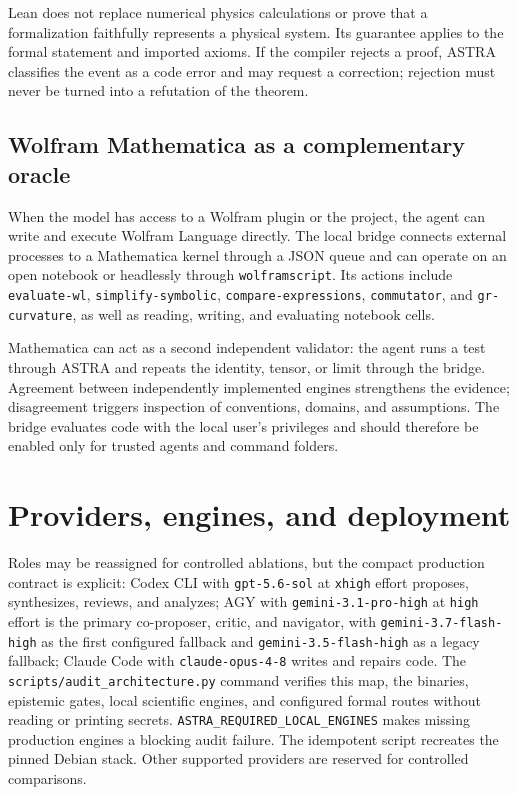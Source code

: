 \documentclass[11pt,a4paper]{article}
\begin{document}
Lean does not replace numerical physics calculations or prove that a formalization faithfully represents a physical system. Its guarantee applies to the formal statement and imported axioms. If the compiler rejects a proof, ASTRA classifies the event as a code error and may request a correction; rejection must never be turned into a refutation of the theorem.

\subsection{Wolfram Mathematica as a complementary oracle}

When the model has access to a Wolfram plugin or the  project, the agent can write and execute Wolfram Language directly. The local bridge connects external processes to a Mathematica kernel through a JSON queue and can operate on an open notebook or headlessly through \texttt{wolframscript}. Its actions include \texttt{evaluate-wl}, \texttt{simplify-symbolic}, \texttt{compare-expressions}, \texttt{commutator}, and \texttt{gr-curvature}, as well as reading, writing, and evaluating notebook cells.

Mathematica can act as a second independent validator: the agent runs a test through ASTRA and repeats the identity, tensor, or limit through the bridge. Agreement between independently implemented engines strengthens the evidence; disagreement triggers inspection of conventions, domains, and assumptions. The bridge evaluates code with the local user's privileges and should therefore be enabled only for trusted agents and command folders.

\section{Providers, engines, and deployment}

Roles may be reassigned for controlled ablations, but the compact production contract is explicit: Codex CLI with \texttt{gpt-5.6-sol} at \texttt{xhigh} effort proposes, synthesizes, reviews, and analyzes; AGY with \texttt{gemini-3.1-pro-high} at \texttt{high} effort is the primary co-proposer, critic, and navigator, with \texttt{gemini-3.7-flash-high} as the first configured fallback and \texttt{gemini-3.5-flash-high} as a legacy fallback; Claude Code with \texttt{claude-opus-4-8} writes and repairs code. The \texttt{scripts/audit\_architecture.py} command verifies this map, the binaries, epistemic gates, local scientific engines, and configured formal routes without reading or printing secrets. \texttt{ASTRA\_REQUIRED\_LOCAL\_ENGINES} makes missing production engines a blocking audit failure. The idempotent  script recreates the pinned Debian stack. Other supported providers are reserved for controlled comparisons.
\end{document}
